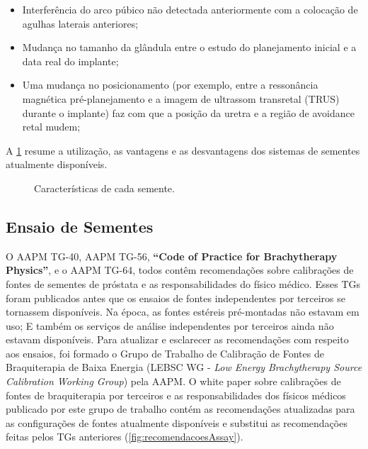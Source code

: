 \documentclass[11pt,a4paper]{article}
\newcounter{exemplo}
\begin{document}
	\begin{itemize}[label=\textcolor{CarnationPink}{$\blacktriangleright$}]
		\item Interferência do arco púbico não detectada anteriormente com a colocação de agulhas laterais anteriores;
		\item Mudança no tamanho da glândula entre o estudo do planejamento inicial e a data real do implante;
		\item Uma mudança no posicionamento (por exemplo, entre a ressonância magnética pré-planejamento e a imagem de ultrassom transretal (TRUS) durante o implante) faz com que a posição da uretra e a região de avoidance retal mudem;
	\end{itemize}

	A \ref{fig:sistemasSementes} resume a utilização, as vantagens e as desvantagens dos sistemas de sementes atualmente disponíveis.

	\begin{figure}[h]
		\centering
		\caption{Características de cada semente.}
		\label{fig:sistemasSementes}
	\end{figure}

\subsection*{Ensaio de Sementes}  

	O AAPM TG-40, AAPM TG-56, \textbf{``Code of Practice for Brachytherapy Physics''}, e o AAPM TG-64, todos contêm recomendações sobre calibrações de fontes de sementes de próstata e as responsabilidades do físico médico. Esses TGs foram publicados antes que os ensaios de fontes independentes por terceiros se tornassem disponíveis. Na época, as fontes estéreis pré-montadas não estavam em uso; E também os serviços de análise independentes por terceiros ainda não estavam disponíveis. Para atualizar e esclarecer as recomendações com respeito aos ensaios, foi formado o Grupo de Trabalho de Calibração de Fontes de Braquiterapia de Baixa Energia (LEBSC WG -  \textit{Low Energy Brachytherapy Source Calibration Working Group}) pela AAPM. O white paper sobre calibrações de fontes de braquiterapia por terceiros e as responsabilidades dos físicos médicos publicado por este grupo de trabalho contém as recomendações atualizadas para as configurações de fontes atualmente disponíveis e substitui as recomendações feitas pelos TGs anteriores (\ref{fig:recomendacoesAssay}).
\end{document}

